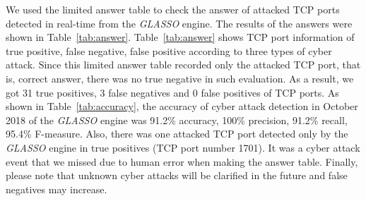 \documentclass[conference]{IEEEtran}
\begin{document}
We used the limited answer table to check the answer of attacked TCP ports detected in real-time from the {\it GLASSO} engine.
The results of the answers were shown in Table~\ref{tab:answer}.
Table~\ref{tab:answer} shows TCP port information of true positive, false negative, false positive according to three types of cyber attack.
Since this limited answer table recorded only the attacked TCP port, that is, correct answer, there was no true negative in such evaluation.
As a result, we got 31 true positives, 3 false negatives and 0 false positives of TCP ports.
As shown in Table~\ref{tab:accuracy}, the accuracy of cyber attack detection in October 2018 of the {\it GLASSO} engine was 91.2\% accuracy, 100\% precision, 91.2\% recall, 95.4\% F-measure.
Also, there was one attacked TCP port detected only by the {\it GLASSO} engine in true positives (TCP port number 1701).
It was a cyber attack event that we missed due to human error when making the answer table.
Finally, please note that unknown cyber attacks will be clarified in the future and false negatives may increase.
\end{document}
